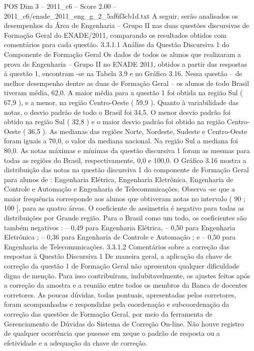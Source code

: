 \begin{textsample}{POS Dim 3 – 2011\_c6 – Score 2.00 – 2011\_c6/enade\_2011\_eng\_g\_2\_5af6f3cb1d.txt}
A seguir, serão analisados os desempenhos da Área de Engenharia – Grupo II nas duas questões discursivas de Formação Geral do ENADE/2011, comparando os resultados obtidos com comentários para cada questão. 3.3.1.1 Análise da Questão Discursiva 1 do Componente de Formação Geral Os dados de todos os alunos que realizaram a prova de Engenharia – Grupo II no ENADE 2011, obtidos a partir das respostas à questão 1, encontram -se na Tabela 3.9 e no Gráfico 3.16.
Nessa questão – de melhor desempenho dentre as duas de Formação Geral – os alunos de todo Brasil tiveram média, 62,0.
A maior média para a questão 1 foi obtida na região Sul ( 67,9 ), e a menor, na região Centro-Oeste ( 59,9 ).
Quanto à variabilidade das notas, o desvio padrão de todo o Brasil foi 34,5.
O menor desvio padrão foi obtido na região Sul ( 32,8 ) e o maior desvio padrão foi obtido na região Centro-Oeste ( 36,5 ).
As medianas das regiões Norte, Nordeste, Sudeste e Centro-Oeste foram iguais a 70,0, o valor da mediana nacional.
Na região Sul a mediana foi 80,0.
As notas máximas e mínimas da questão discursiva 1 foram as mesmas para todas as regiões do Brasil, respectivamente, 0,0 e 100,0.
O Gráfico 3.16 mostra a distribuição das notas na questão discursiva 1 do componente de Formação Geral para alunos de : Engenharia Elétrica, Engenharia Eletrônica, Engenharia de Controle e Automação e Engenharia de Telecomunicações.
Observa -se que a maior frequência corresponde aos alunos que obtiveram notas no intervalo ( 90 ; 100 ], para as quatro áreas.
O coeficiente de assimetria é negativo para todas as distribuições por Grande região.
Para o Brasil como um todo, os coeficientes são também negativos : – 0,49 para Engenharia Elétrica, – 0,50 para Engenharia Eletrônica ; – 0,36 para Engenharia de Controle e Automação ; e – 0,50 para Engenharia de Telecomunicações. 3.3.1.2 Comentários sobre a correção das respostas à Questão Discursiva 1 De maneira geral, a aplicação da chave de correção da questão 1 de Formação Geral não apresentou qualquer dificuldade digna de menção.
Para isso contribuíram, indubitavelmente, os ajustes feitos após a correção da amostra e a reunião entre todos os membros da Banca de docentes corretores.
As poucas dúvidas, todas pontuais, apresentadas pelos corretores, foram acompanhadas e respondidas pela coordenação e subcoordenação da correção das questões de Formação Geral, por meio da ferramenta de Gerenciamento de Dúvidas do Sistema de Correção On-line.
Não houve registro de qualquer ocorrência que pusesse em xeque o padrão de resposta ou a efetividade e a adequação da chave de correção.

\end{textsample}
